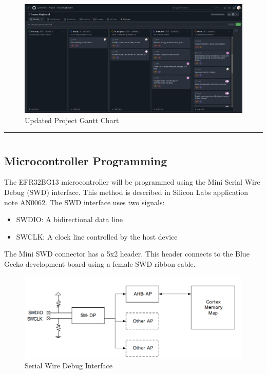 \documentclass[a4paper,11pt]{article}%
\begin{document}
\begin{figure}[h]
    \centering
    \includegraphics[width=\textwidth]{figures/update3.png}
    \caption{Updated Project Gantt Chart}
    \label{fig:gantt_chart}
\end{figure}


\pagebreak

\hrule

\section{\color{red}{Update 4}}

\subsection{Microcontroller Programming}

The EFR32BG13 microcontroller will be programmed using the Mini Serial Wire Debug (SWD) interface. This method is described in Silicon Labs application note AN0062. The SWD interface uses two signals:

\begin{itemize}
    \item SWDIO: A bidirectional data line
    \item SWCLK: A clock line controlled by the host device
\end{itemize}

The Mini SWD connector has a 5x2 header. This header connects to the Blue Gecko development board using a female SWD ribbon cable.

\begin{figure}[H]
    \centering
    \includegraphics[width=\textwidth]{figures/serial_wire.png}
    \caption{Serial Wire Debug Interface}
\end{figure}
\end{document}
